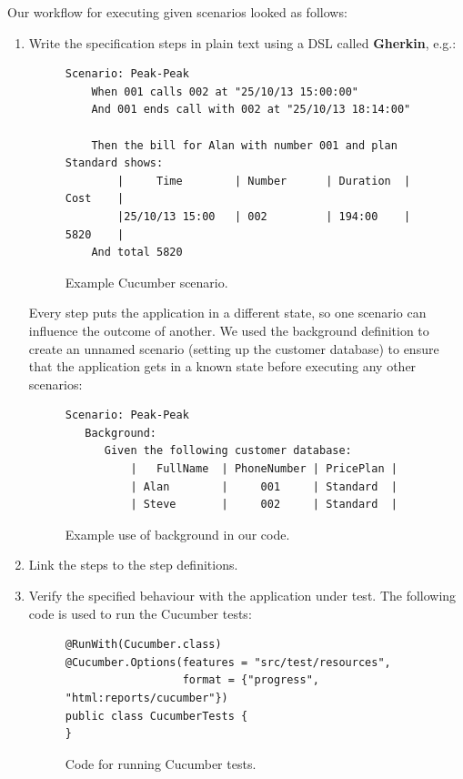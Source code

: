 \documentclass[a4paper]{article}
\begin{document}
Our workflow for executing given scenarios looked as follows:
\begin{enumerate}
\item Write the specification steps in plain text using a DSL called {\bf Gherkin}, e.g.:

\begin{figure}[h]
\begin{verbatim}
Scenario: Peak-Peak
    When 001 calls 002 at "25/10/13 15:00:00"
    And 001 ends call with 002 at "25/10/13 18:14:00"

    Then the bill for Alan with number 001 and plan Standard shows:
        |     Time        | Number      | Duration  | Cost    |
        |25/10/13 15:00   | 002         | 194:00    | 5820    |
    And total 5820

\end{verbatim}
\caption{Example Cucumber scenario.}
\end{figure}

Every step puts the application in a different state, so one scenario can influence the outcome of another. We used the background definition to create an unnamed scenario (setting up the customer database) to ensure that the application gets in a known state before executing any other scenarios:

\begin{figure}[h]
\begin{verbatim}
Scenario: Peak-Peak
   Background:
      Given the following customer database:
          |   FullName  | PhoneNumber | PricePlan |
          | Alan        |     001     | Standard  |
          | Steve       |     002     | Standard  |

\end{verbatim}
\caption{Example use of background in our code.}
\end{figure}

\item Link the steps to the step definitions.
\item Verify the specified behaviour with the application under test.
The following code is used to run the Cucumber tests:

\begin{figure}[h]
\begin{verbatim}
@RunWith(Cucumber.class)
@Cucumber.Options(features = "src/test/resources",
                  format = {"progress", "html:reports/cucumber"})
public class CucumberTests {
}

\end{verbatim}
\caption{Code for running Cucumber tests.}
\end{figure}

\end{enumerate}
\end{document}
